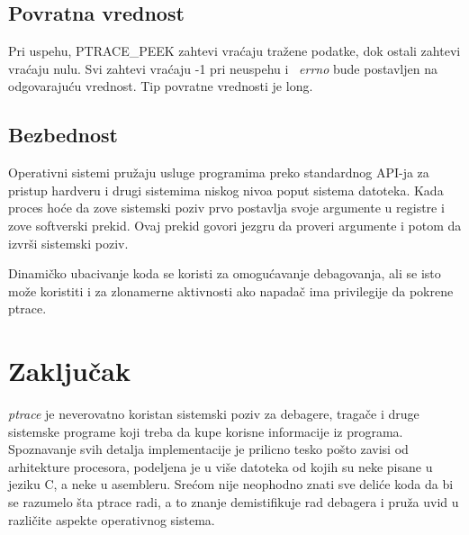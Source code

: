 \documentclass[a4paper]{article}
\begin{document}
\subsection{Povratna vrednost}	
\label{sec:return}

Pri uspehu, PTRACE\_PEEK zahtevi vraćaju tražene podatke, dok ostali zahtevi vraćaju nulu. 
Svi zahtevi vraćaju -1 pri neuspehu i ~\emph{errno} bude postavljen na odgovarajuću vrednost.
Tip povratne vrednosti je long.


\subsection{Bezbednost}	

Operativni sistemi pružaju usluge programima preko standardnog API-ja za pristup
hardveru i drugi sistemima niskog nivoa poput sistema datoteka. 
Kada proces hoće da zove sistemski poziv prvo postavlja svoje argumente u registre i 
zove softverski prekid. Ovaj prekid govori jezgru da proveri argumente i potom da
izvrši sistemski poziv.

Dinamičko ubacivanje koda se koristi za omogućavanje debagovanja, ali se isto može koristiti
i za zlonamerne aktivnosti ako napadač ima privilegije da pokrene ptrace.

\section{Zaključak}

\emph{ptrace} je neverovatno koristan sistemski poziv za debagere, tragače i druge sistemske 
programe koji treba da kupe korisne informacije iz programa. Spoznavanje svih detalja implementacije 
je prilicno tesko pošto zavisi od arhitekture procesora, podeljena je u više datoteka od kojih su
neke pisane u jeziku C, a neke u asembleru. Srećom nije neophodno znati sve deliće koda da bi
se razumelo šta ptrace radi, a to znanje demistifikuje rad debagera i pruža uvid u različite 
aspekte operativnog sistema.

\appendix
 


\appendix
\end{document}
